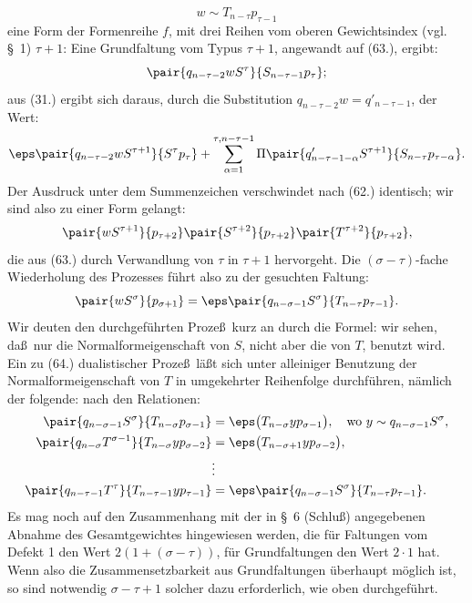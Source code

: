 \[
 w\sim T_{n-\tau}p_{\tau-1}
\]
eine Form der Formenreihe $f$, mit drei Reihen vom oberen Gewichtsindex (vgl. \S\ 1) $\tau+1$:
Eine Grundfaltung vom Typus $\tau+1$, angewandt auf (63.), ergibt:
\[
 \pair{q_{n-\tau-2}wS^\tau}{S_{n-\tau-1}p_\tau};
\]
aus (31.) ergibt sich daraus, durch die Substitution $q_{n-\tau-2}w=q'_{n-\tau-1}$, der Wert:
\[
 \eps\pair{q_{n-\tau-2}wS^{\tau+1}}{S^\tau p_\tau}
 +\sum_{\alpha=1}^{\tau,n-\tau-1}\Pi\pair{q'_{n-\tau-1-\alpha}S^{\tau+1}}{S_{n-\tau}p_{\tau-\alpha}}.
\]
Der Ausdruck unter dem Summenzeichen verschwindet nach (62.) identisch; wir sind also zu einer Form gelangt:
\[
 \pair{wS^{\tau+1}}{p_{\tau+2}}\pair{S^{\tau+2}}{p_{\tau+2}}\pair{T^{\tau+2}}{p_{\tau+2}},
\]
die aus (63.) durch Verwandlung von $\tau$ in $\tau+1$ hervorgeht. Die $(\sigma-\tau)$-fache Wiederholung des Prozesses f\"uhrt also zu der gesuchten Faltung:
\[
 \pair{wS^\sigma}{p_{\sigma+1}}=\eps\pair{q_{n-\sigma-1}S^\sigma}{T_{n-\tau}p_{\tau-1}}.
\]
Wir deuten den durchgef\"uhrten Proze\ss\ kurz an durch die Formel:
wir sehen, da\ss\ nur die Normalformeigenschaft von $S$, nicht aber die von $T$, benutzt wird. Ein zu (64.) dualistischer Proze\ss\ l\"a\ss t sich unter alleiniger Benutzung der Normalformeigenschaft von $T$ in umgekehrter Reihenfolge durchf\"uhren, n\"amlich der folgende:
nach den Relationen:
\begin{align*}
\pair{q_{n-\sigma-1}S^\sigma}{T_{n-\sigma}p_{\sigma-1}}&=\eps\bigl(T_{n-\sigma}y p_{\sigma-1}\bigr),\quad \text{wo }y\sim q_{n-\sigma-1}S^\sigma,\\
\pair{q_{n-\sigma}T^{\sigma-1}}{T_{n-\sigma}yp_{\sigma-2}}&=\eps\bigl(T_{n-\sigma+1}y p_{\sigma-2}\bigr),\\
&\vdots\\
\pair{q_{n-\tau-1}T^\tau}{T_{n-\tau-1}yp_{\tau-1}}&=\eps\pair{q_{n-\sigma-1}S^\sigma}{T_{n-\tau}p_{\tau-1}}.
\end{align*}
Es mag noch auf den Zusammenhang mit der in \S\ 6 (Schlu\ss) angegebenen Abnahme des Gesamtgewichtes hingewiesen werden, die f\"ur Faltungen vom Defekt 1 den Wert $2(1+(\sigma-\tau))$, f\"ur Grundfaltungen den Wert $2\cdot1$ hat. Wenn also die Zusammensetzbarkeit aus Grundfaltungen \"uberhaupt m\"oglich ist, so sind notwendig $\sigma-\tau+1$ solcher dazu erforderlich, wie oben durchgef\"uhrt.

